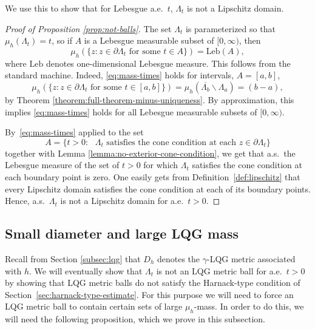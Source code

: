 \documentclass[12pt]{amsart}
\numberwithin{equation}{section}
\newcommand{\regcluster}[2]{\hyperref[eq:regular-cluster]{\Lambda^{#1}_{#2}}}
\begin{document}
	
	
	We use this to show that for Lebesgue a.e.\ $t$, ${\regcluster{}{t}}$ is not a Lipschitz domain. 
	
	\begin{proof}[Proof of Proposition \ref{prop:not-balls}]
		The set ${\regcluster{}{t}}$ is parameterized so that $\mu_h({\regcluster{}{t}})  = t$, so if $A$ is a Lebesgue measurable subset of $[0, \infty)$, then
		\begin{equation}\label{eq:mass-times}
		\mu_h(\{z : z \in \partial {\regcluster{}{t}} \mbox{ for some $t \in A$}\}) = \mbox{Leb}(A) ,
		\end{equation} 
		where $\mbox{Leb}$ denotes one-dimensional Lebesgue measure. This follows from the standard machine. Indeed, \eqref{eq:mass-times} holds for intervals,  $A = [a,b]$,
		\[
		\mu_h(\{z : z \in \partial {\regcluster{}{t}} \mbox{ for some $t \in [a,b]$}\}) = \mu_h( \overline{\regcluster{}{b}} \backslash 
		\regcluster{}{a}) = 
		(b-a),
		\]
		by Theorem \ref{theorem:full-theorem-minus-uniqueness}.
		By approximation, this implies \eqref{eq:mass-times} holds for all Lebesgue measurable subsets of $[0,\infty)$. 
		
		
		By~\eqref{eq:mass-times} applied to the set 
		\[
		A = \{t > 0 : \mbox{ ${\regcluster{}{t}}$ satisfies the cone condition at each $z\in \partial {\regcluster{}{t}}$}\}
		\]
		together with Lemma \ref{lemma:no-exterior-cone-condition}, we get that a.s.\ the Lebesgue measure of the set of $t>0$ for which ${\regcluster{}{t}}$ satisfies the cone condition at each boundary point is zero. One easily gets from Definition~\ref{def:lipschitz} that every Lipschitz domain satisfies the cone condition at each of its boundary points. Hence, a.s.\ ${\regcluster{}{t}}$ is not a Lipschitz domain for a.e.\ $t>0$.
	\end{proof}
	
	\subsection{Small diameter and large LQG mass} \label{subsec:small-diamter-large-lqg-mass}
	
	Recall from Section \ref{subsec:lqg} that $D_h$ denotes the $\gamma$-LQG metric associated with $h$. 
	We will eventually show that ${\regcluster{}{t}}$ is not an LQG metric ball for a.e.\ $t>0$ by showing that LQG metric balls do not satisfy the Harnack-type condition of Section~\ref{sec:harnack-type-estimate}. For this purpose we will need to force an LQG metric ball to contain certain sets of large $\mu_h$-mass. In order to do this, we will need the following proposition, which we prove in this subsection. 
	
\end{document}
